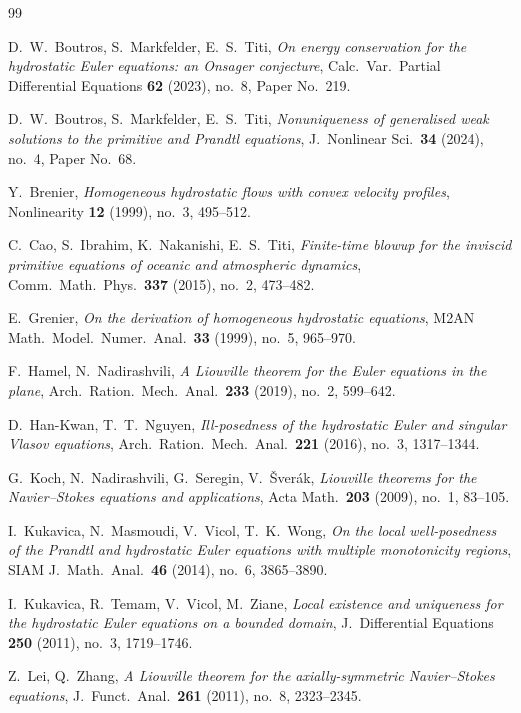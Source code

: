 \documentclass[11pt]{amsart}
\theoremstyle{definition}
\theoremstyle{remark}
\begin{document}
\begin{thebibliography}{99}

D.~W.~Boutros, S.~Markfelder, E.~S.~Titi,
\emph{On energy conservation for the hydrostatic Euler equations: an
Onsager conjecture}, Calc.\ Var.\ Partial Differential Equations
\textbf{62} (2023), no.~8, Paper No.~219.

D.~W.~Boutros, S.~Markfelder, E.~S.~Titi,
\emph{Nonuniqueness of generalised weak solutions to the primitive and
Prandtl equations}, J.~Nonlinear Sci.\ \textbf{34} (2024), no.~4,
Paper No.~68.

Y.~Brenier,
\emph{Homogeneous hydrostatic flows with convex velocity profiles},
Nonlinearity \textbf{12} (1999), no.~3, 495--512.

C.~Cao, S.~Ibrahim, K.~Nakanishi, E.~S.~Titi,
\emph{Finite-time blowup for the inviscid primitive equations of
oceanic and atmospheric dynamics}, Comm.\ Math.\ Phys.\ \textbf{337}
(2015), no.~2, 473--482.

E.~Grenier,
\emph{On the derivation of homogeneous hydrostatic equations},
M2AN Math.\ Model.\ Numer.\ Anal.\ \textbf{33} (1999), no.~5,
965--970.

F.~Hamel, N.~Nadirashvili,
\emph{A Liouville theorem for the Euler equations in the plane},
Arch.\ Ration.\ Mech.\ Anal.\ \textbf{233} (2019), no.~2, 599--642.

D.~Han-Kwan, T.~T.~Nguyen,
\emph{Ill-posedness of the hydrostatic Euler and singular Vlasov
equations}, Arch.\ Ration.\ Mech.\ Anal.\ \textbf{221} (2016), no.~3,
1317--1344.

G.~Koch, N.~Nadirashvili, G.~Seregin, V.~\v Sver\'ak,
\emph{Liouville theorems for the Navier--Stokes equations and
applications}, Acta Math.\ \textbf{203} (2009), no.~1, 83--105.

I.~Kukavica, N.~Masmoudi, V.~Vicol, T.~K.~Wong,
\emph{On the local well-posedness of the Prandtl and hydrostatic Euler
equations with multiple monotonicity regions},
SIAM J.~Math.\ Anal.\ \textbf{46} (2014), no.~6, 3865--3890.

I.~Kukavica, R.~Temam, V.~Vicol, M.~Ziane,
\emph{Local existence and uniqueness for the hydrostatic Euler
equations on a bounded domain}, J.~Differential Equations \textbf{250}
(2011), no.~3, 1719--1746.

Z.~Lei, Q.~Zhang,
\emph{A Liouville theorem for the axially-symmetric Navier--Stokes
equations}, J.~Funct.\ Anal.\ \textbf{261} (2011), no.~8, 2323--2345.


\end{thebibliography}
\end{document}
